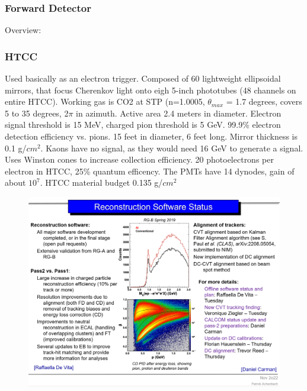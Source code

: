     \subsubsection{Forward Detector}
        Overview:
        \subsubsection{HTCC}
            Used basically as an electron trigger. Composed of 60 lightweight ellipsoidal mirrors, that focus Cherenkov light onto eigh 5-inch phototubes (48 channels on entire HTCC). Working gas is CO2 at STP (n=1.0005, $\theta_{max}$ = 1.7 degrees, covers 5 to 35 degrees, 2$\pi$ in azimuth. Active area 2.4 meters in diameter. Electron signal threshold is 15 MeV, charged pion threshold is 5 GeV. 99.9\% electron detection efficiency vs. pions. 15 feet in diameter, 6 feet long. Mirror thickness is 0.1 g/$cm^2$. Kaons have no signal, as they would need 16 GeV to generate a signal. Uses Winston cones to increase collection efficiency. 20 photoelectrons per electron in HTCC, 25\% quantum efficency. The PMTs have 14 dynodes, gain of about $10^7$. HTCC material budget 0.135 g/$cm^2$
            
            									
			 \begin{figure}[H]
    			\centering
    			\includegraphics[width=12cm]{Chapters/Ch2-Experiment/recon_pid/pass2vpass1.png}
			\end{figure}
			
						
									
